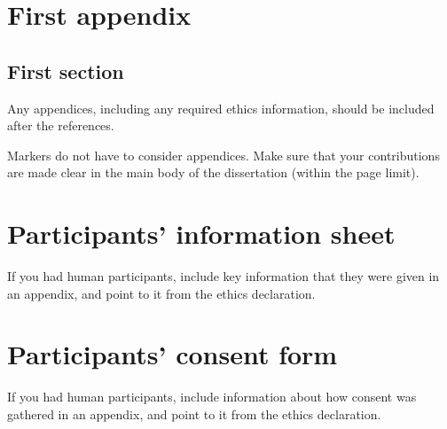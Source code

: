 \documentclass[logo,msc,inf]{infthesis}     %
\begin{document}






\appendix

\chapter{First appendix}

\section{First section}

Any appendices, including any required ethics information, should be included
after the references.

Markers do not have to consider appendices. Make sure that your contributions
are made clear in the main body of the dissertation (within the page limit).

\chapter{Participants' information sheet}

If you had human participants, include key information that they were given in
an appendix, and point to it from the ethics declaration.

\chapter{Participants' consent form}

If you had human participants, include information about how consent was
gathered in an appendix, and point to it from the ethics declaration.
\end{document}
